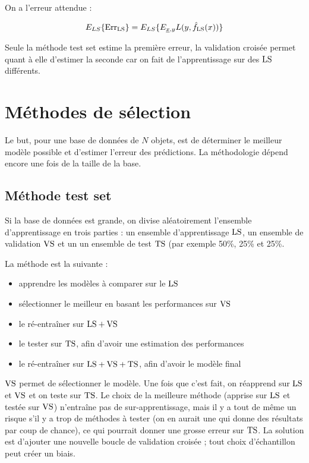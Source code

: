 	On a l'erreur attendue :
	
	$$E_{LS}\{\text{Err}_{\text{LS}}\} = E_{LS}\{E_{\underline{x}, y}{L(y, \hat{f}_{\text{LS}}(x))}\}$$
	
	Seule la méthode test set estime la première erreur, la validation croisée permet quant à elle d'estimer la seconde car on fait de l'apprentissage sur des $\text{LS}$ différents.
	
\section{Méthodes de sélection}

Le but, pour une base de données de $N$ objets, est de déterminer le meilleur modèle possible et d'estimer l'erreur des prédictions. La méthodologie dépend encore une fois de la taille de la base.

	\subsection{Méthode test set}
	
	Si la base de données est grande, on divise aléatoirement l'ensemble d'apprentissage en trois parties : un ensemble d'apprentissage $\text{LS}$, un ensemble de validation $\text{VS}$ et un un ensemble de test $\text{TS}$ (par exemple 50\%, 25\% et 25\%.
	
	
	La méthode est la suivante :
	
	\begin{itemize}
		\item apprendre les modèles à comparer sur le $\text{LS}$
		\item sélectionner le meilleur en basant les performances sur $\text{VS}$
		\item le ré-entraîner sur $\text{LS} + \text{VS}$
		\item le tester sur $\text{TS}$, afin d'avoir une estimation des performances
		\item le ré-entraîner sur $\text{LS} + \text{VS} + \text{TS}$, afin d'avoir le modèle final
	\end{itemize}
	
	$\text{VS}$ permet de sélectionner le modèle. Une fois que c'est fait, on réapprend sur $\text{LS}$ et $\text{VS}$ et on teste sur $\text{TS}$. Le choix de la meilleure méthode (apprise sur $\text{LS}$ et testée sur $\text{VS}$) n'entraîne pas de sur-apprentissage, mais il y a tout de même un risque s'il y a trop de méthodes à tester (on en aurait une qui donne des résultats par coup de chance), ce qui pourrait donner une grosse erreur sur $\text{TS}$. La solution est d'ajouter une nouvelle boucle de validation croisée ; tout choix d'échantillon peut créer un biais.
	
